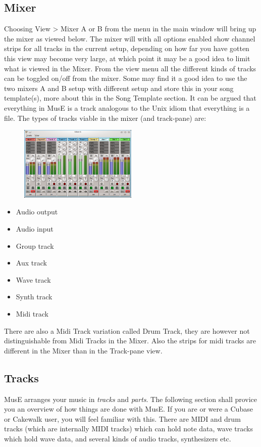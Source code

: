 \documentclass[a4paper]{report}
\begin{document}
\subsection{Mixer}
Choosing View > Mixer A or B from the menu in the main window will bring up the mixer as viewed below. The mixer will with all options enabled show channel strips for all tracks in the current setup, depending on how far you have gotten this view may become very large, at which point it may be a good idea to limit what is viewed in the Mixer. From the view menu all the different kinds of tracks can be toggled on/off from the mixer. Some may find it a good idea to use the two mixers A and B setup with different setup and store this in your song template(s), more about this in the Song Template section. It can be argued that everything in MusE is a track analogous to the Unix idiom that everything is a file.
The types of tracks viable in the mixer (and track-pane) are:
\begin{figure}
\includegraphics[width=0.5\textwidth]{pics/mixer}
\end{figure}
\begin {itemize}
\item Audio output
\item Audio input
\item Group track
\item Aux track
\item Wave track
\item Synth track
\item Midi track
\end{itemize}


There are also a Midi Track variation called Drum Track, they are however not distinguishable from Midi Tracks in the Mixer. Also the strips for midi tracks are different in the Mixer than in the Track-pane view.


\subsection{Tracks}
MusE arranges your music in \emph{tracks} and \emph{parts}. The following
section shall provice you an overview of how things are done with MusE.
If you are or were a Cubase or Cakewalk user, you will feel familiar with
this. There are
MIDI and drum tracks (which are internally MIDI tracks) which can hold
note data, wave tracks which hold wave data, and several kinds of
audio tracks, synthesizers etc.
\end{document}
